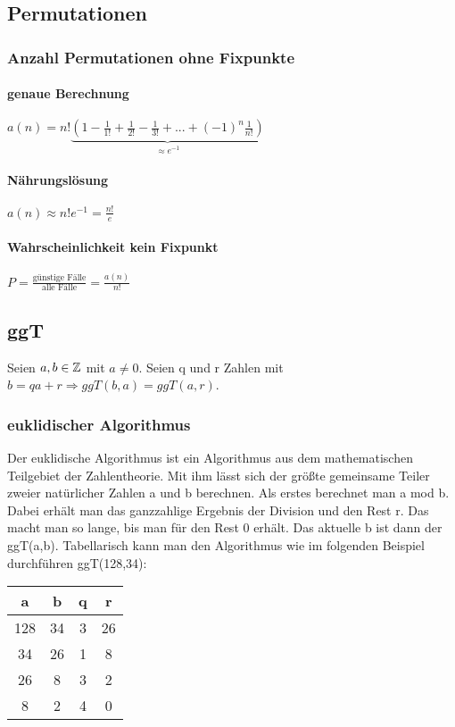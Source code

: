 \subsection{Permutationen}
\subsubsection{Anzahl Permutationen ohne Fixpunkte}
\paragraph{genaue Berechnung}
$a(n)=n!\underbrace{(1-\frac{1}{1!}+\frac{1}{2!}-\frac{1}{3!}+...+(-1)^n \frac{1}{n!})}_{\approx e^{-1}}$
\paragraph{Nährungslösung}
$a(n) \approx n! e^{-1}= \frac{n!}{e}$
\paragraph{Wahrscheinlichkeit kein Fixpunkt}
$P=\frac{\textrm{günstige Fälle}}{\textrm{alle Fälle}} = \frac{a(n)}{n!}$

\subsection{ggT} Seien $a,b \in \mathbb{Z}$ mit $a \neq 0$. Seien q und r Zahlen mit $b=qa+r \Rightarrow ggT(b,a)=ggT(a,r)$.

\subsubsection{euklidischer Algorithmus} Der euklidische Algorithmus ist ein Algorithmus aus dem mathematischen Teilgebiet der Zahlentheorie. Mit ihm lässt sich der größte gemeinsame Teiler zweier natürlicher Zahlen a und b berechnen. Als erstes berechnet man a mod b. Dabei erhält man das ganzzahlige Ergebnis der Division und den Rest r. Das macht man so lange, bis man für den Rest 0 erhält. Das aktuelle b ist dann der ggT(a,b). Tabellarisch kann man den Algorithmus wie im folgenden Beispiel durchführen ggT(128,34):

\begin{tabular}{|c|c|c|c|}
\hline a & b & q & r \\ 
\hline 128 & 34 & 3 & 26 \\ 
\hline 34 & 26 & 1 & 8 \\ 
\hline 26 & 8 & 3 & 2 \\ 
\hline 8 & 2 & 4 & 0 \\ 
\hline 
\end{tabular} 

